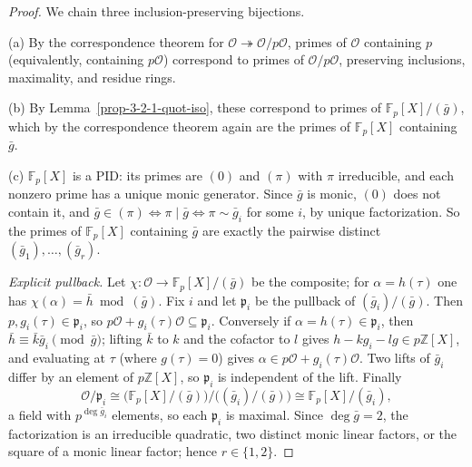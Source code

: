 \begin{proof}
  We chain three inclusion-preserving bijections.

  (a) By the correspondence theorem for $\mathcal{O} \twoheadrightarrow
  \mathcal{O}/p\mathcal{O}$, primes of $\mathcal{O}$ containing $p$
  (equivalently, containing $p\mathcal{O}$) correspond to primes of
  $\mathcal{O}/p\mathcal{O}$, preserving inclusions, maximality, and residue
  rings.

  (b) By Lemma~\ref{prop-3-2-1-quot-iso}, these correspond to primes of
  $\mathbb{F}_p[X]/(\bar g)$, which by the correspondence theorem again are
  the primes of $\mathbb{F}_p[X]$ containing $\bar g$.

  (c) $\mathbb{F}_p[X]$ is a PID: its primes are $(0)$ and $(\pi)$ with
  $\pi$ irreducible, and each nonzero prime has a unique monic generator.
  Since $\bar g$ is monic, $(0)$ does not contain it, and $\bar g \in (\pi)
  \iff \pi \mid \bar g \iff \pi \sim \bar g_i$ for some $i$, by unique
  factorization. So the primes of $\mathbb{F}_p[X]$ containing $\bar g$ are
  exactly the pairwise distinct $(\bar g_1), \dots, (\bar g_r)$.

  \emph{Explicit pullback.} Let $\chi \colon \mathcal{O} \to
  \mathbb{F}_p[X]/(\bar g)$ be the composite; for $\alpha = h(\tau)$ one has
  $\chi(\alpha) = \bar h \bmod (\bar g)$. Fix $i$ and let $\mathfrak{p}_i$ be
  the pullback of $(\bar g_i)/(\bar g)$. Then $p, g_i(\tau) \in
  \mathfrak{p}_i$, so $p\mathcal{O} + g_i(\tau)\mathcal{O} \subseteq
  \mathfrak{p}_i$. Conversely if $\alpha = h(\tau) \in \mathfrak{p}_i$, then
  $\bar h \equiv \bar k \bar g_i \pmod{\bar g}$; lifting $\bar k$ to $k$ and
  the cofactor to $l$ gives $h - k g_i - l g \in p\mathbb{Z}[X]$, and
  evaluating at $\tau$ (where $g(\tau) = 0$) gives $\alpha \in p\mathcal{O} +
  g_i(\tau)\mathcal{O}$. Two lifts of $\bar g_i$ differ by an element of
  $p\mathbb{Z}[X]$, so $\mathfrak{p}_i$ is independent of the lift. Finally
  \[
    \mathcal{O}/\mathfrak{p}_i \cong
    \big(\mathbb{F}_p[X]/(\bar g)\big)\big/\big((\bar g_i)/(\bar g)\big)
    \cong \mathbb{F}_p[X]/(\bar g_i),
  \]
  a field with $p^{\deg \bar g_i}$ elements, so each $\mathfrak{p}_i$ is
  maximal. Since $\deg \bar g = 2$, the factorization is an irreducible
  quadratic, two distinct monic linear factors, or the square of a monic
  linear factor; hence $r \in \{1, 2\}$.
\end{proof}

